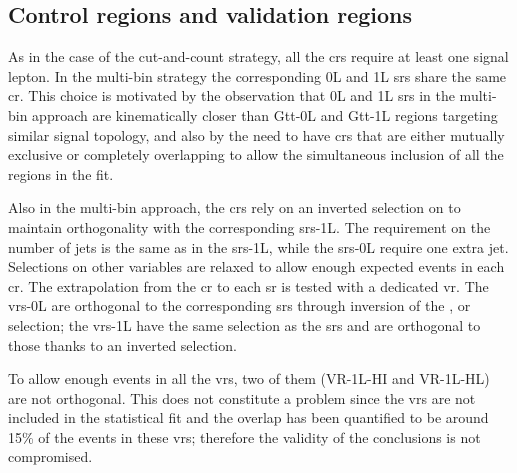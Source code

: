 \subsection{Control regions and validation regions}

As in the case of the cut-and-count strategy, all the \glspl{cr} require at least one signal lepton. 
In the multi-bin strategy the corresponding 0L and 1L \glspl{sr} share the same \gls{cr}.
This choice is motivated by the observation that 0L and 1L \glspl{sr} in the multi-bin approach are 
kinematically closer than Gtt-0L and Gtt-1L regions targeting similar signal topology, 
and also by the need to have \glspl{cr} that are either mutually exclusive or completely overlapping to 
allow the simultaneous inclusion of all the regions in the fit. 

Also in the multi-bin approach, the \glspl{cr} rely on an inverted selection on \mt to maintain orthogonality with 
the corresponding \glspl{sr}-1L. The requirement on the number of jets is the same as in the \glspl{sr}-1L, while the 
\glspl{sr}-0L require one extra jet. Selections on other variables are relaxed to allow enough expected \ttbar events in 
each \gls{cr}.
The extrapolation from the \gls{cr} to each \gls{sr} is tested with a dedicated \gls{vr}. 
The \glspl{vr}-0L are orthogonal to the corresponding \glspl{sr} through inversion of the \mtb, \meff or \met selection;
the \glspl{vr}-1L have the same \mt selection as the \glspl{sr} and are orthogonal to those thanks to
an inverted \mtb selection.

To allow enough events in all the \glspl{vr}, two of them (VR-1L-HI and VR-1L-HL) are not orthogonal.
This does not constitute a problem since the \glspl{vr}
are not included in the statistical fit and 
the overlap has been quantified to be around 15\% of the events in these \glspl{vr}; therefore 
the validity of the conclusions is not compromised. 


